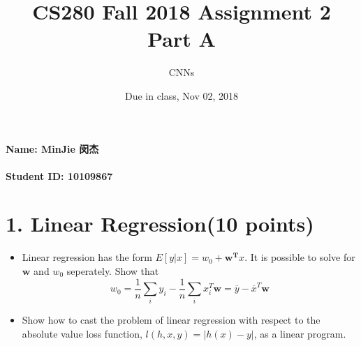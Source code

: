 \documentclass[12pt]{article}%
\begin{document}
\title{CS280 Fall 2018 Assignment 2 \\ Part A}
\author{CNNs}
\date{Due in class, Nov 02, 2018}
\maketitle

\paragraph{Name: MinJie 闵杰 }

\paragraph{Student ID: 10109867}

\newpage

\section*{1. Linear Regression(10 points)}
\begin{itemize}
	\item Linear regression has the form $E[y\lvert x] = w_{0} + \bm{w^{T}}x$. It is possible to solve for $\bm{w}$ and $w_{0}$ seperately. Show that
	\begin{equation*}
	w_{0} = \frac{1}{n}\sum_{i}y_{i} - \frac{1}{n}\sum_{i}x_{i}^{T}\bm{w} = \overline{y} - \overline{x}^{T}\bm{w} 
	\end{equation*}
	
	
	\item Show how to cast the problem of linear regression with respect to the absolute value loss function, $l(h,x,y)=\lvert h(x) - y \rvert$, as a linear program.
\end{itemize}
\end{document}
